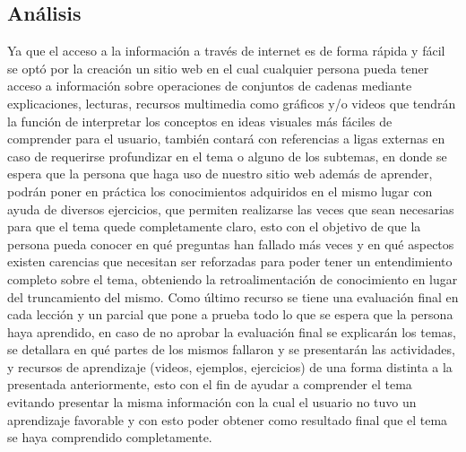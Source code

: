 \documentclass{llncs}
\begin{document}
\subsection{Análisis}
Ya que el acceso a la información a través de internet es de forma rápida y fácil  se optó por la creación un sitio web en el cual cualquier persona pueda tener acceso a información sobre operaciones de conjuntos de cadenas mediante explicaciones, lecturas, recursos multimedia como gráficos y/o videos que tendrán la función de interpretar los conceptos en ideas visuales más fáciles de comprender para el usuario, también contará con referencias a ligas externas en caso de requerirse profundizar en el tema o alguno de los subtemas, en donde se espera que la persona que haga uso de nuestro sitio web además de aprender, podrán poner en práctica los conocimientos adquiridos en el mismo lugar con ayuda de diversos ejercicios, que permiten realizarse las veces que sean necesarias para que el tema quede completamente claro, esto con el objetivo de que la persona pueda conocer en qué preguntas han fallado más veces y en qué aspectos existen carencias que necesitan ser reforzadas para poder tener un entendimiento completo sobre el tema, obteniendo la retroalimentación de conocimiento en lugar del truncamiento del mismo. Como último recurso se tiene una evaluación final en cada lección y un parcial que pone a prueba todo lo que se espera que la persona haya aprendido, en caso de no aprobar la evaluación final se explicarán los temas, se detallara en qué partes de los mismos fallaron y se presentarán las actividades, y recursos de aprendizaje (videos, ejemplos, ejercicios) de una forma distinta a la presentada anteriormente, esto con el fin de ayudar a comprender el tema  evitando presentar la misma información con la cual el usuario no tuvo un aprendizaje favorable y con esto poder obtener como resultado final que el tema se haya comprendido completamente.\\
\end{document}
